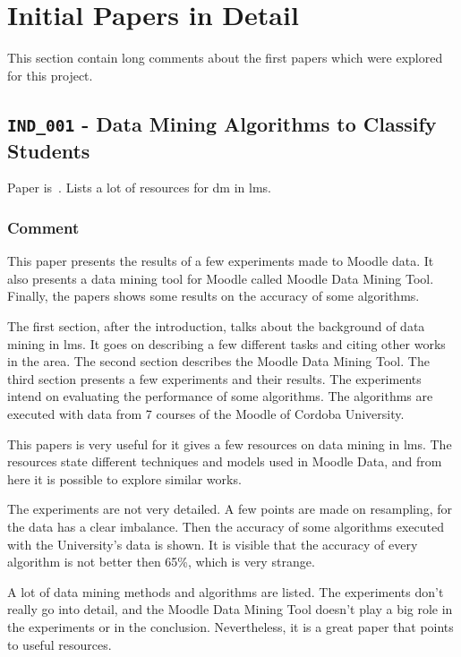 \section{Initial Papers in Detail}

This section contain long comments about the first papers which were explored
for this project.

\subsection{\texttt{IND\_001} - Data Mining Algorithms to Classify Students}

Paper is~\cite{ind_001}. Lists a lot of resources for \gls{dm} in \gls{lms}.

\subsubsection{Comment}

This paper presents the results of a few experiments made to Moodle data. It
also presents a data mining tool for Moodle called Moodle Data Mining Tool.
Finally, the papers shows some results on the accuracy of some algorithms.

The first section, after the introduction, talks about the background of data
mining in \gls{lms}. It goes on describing a few different tasks and citing
other works in the area. The second section describes the Moodle Data Mining
Tool. The third section presents a few experiments and their results. The
experiments intend on evaluating the performance of some algorithms. The
algorithms are executed with data from 7 courses of the Moodle of Cordoba
University.

This papers is very useful for it gives a few resources on data mining in
\gls{lms}. The resources state different techniques and models used in Moodle
Data, and from here it is possible to explore similar works.

The experiments are not very detailed. A few points are made on resampling, for
the data has a clear imbalance. Then the accuracy of some algorithms executed
with the University's data is shown. It is visible that the accuracy of every
algorithm is not better then 65\%, which is very strange.

A lot of data mining methods and algorithms are listed. The experiments don't
really go into detail, and the Moodle Data Mining Tool doesn't play a big role
in the experiments or in the conclusion. Nevertheless, it is a great paper that
points to useful resources.

